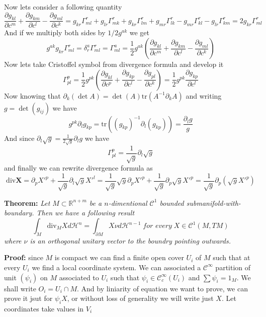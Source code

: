 Now lets consider a following quantity
\[\frac{\partial g_{kl}}{\partial c^m}+\frac{\partial g_{km}}{\partial c^l}-\frac{\partial g_{ml}}{\partial c^k}
=g_{kr}\Gamma^r_{ml}+g_{lr}\Gamma^r_{mk}+g_{kr}\Gamma^r_{lm}+g_{mr}\Gamma^r_{lk}-g_{mr}\Gamma^r_{kl}-g_{lr}\Gamma^r_{km}=2g_{kr}\Gamma^r_{ml}
\]
And if we multiply both sides by $1/2g^{ak}$ we get
\[g^{ak}g_{kr}\Gamma^r_{ml}=\delta_r^a\Gamma^r_{ml}=\Gamma^a_{ml}=\frac{1}{2}g^{ak}(\frac{\partial g_{kl}}{\partial c^m}+\frac{\partial g_{km}}{\partial c^l}-\frac{\partial g_{ml}}{\partial c^k})\]
Now lets take Cristoffel symbol from divergence formula and develop it
\[\Gamma^p_{pl}=\frac{1}{2}g^{pk}(\frac{\partial g_{kl}}{\partial c^p}+\frac{\partial g_{kp}}{\partial c^l}-\frac{\partial g_{pl}}{\partial c^k})
=\frac{1}{2}g^{pk}\frac{\partial g_{kp}}{\partial c^l}\]
Now knowing that $\partial_k(\det A)=\det(A)\text{tr}(A^{-1}\partial_k A)$ and
writing $g=\det(g_{ij})$ we have
\[g^{pk}\partial_l g_{kp}=\text{tr}((g_{kp})^{-1}\partial_l(g_{kp}))=\frac{\partial_l g}{g}\]
And since $\partial_l\sqrt g=\frac{1}{2\sqrt g}\partial_l g$ we have
\[\Gamma^p_{pl}=\frac{1}{\sqrt g}\partial_l\sqrt g\]
and finally we can rewrite divergence formula as
\[\text{div}\mathbf X=\partial_p X'^p+\frac{1}{\sqrt g}\partial_l\sqrt g X'^l
=\frac{1}{\sqrt g}\sqrt g\partial_p X'^p+\frac{1}{\sqrt g}\partial_p\sqrt g X'^p
=\frac{1}{\sqrt g}\partial_p(\sqrt g X'^p)
\]

\vspace{2ex}
\textbf{Theorem:} \textit{Let $M\subset \mathbb R^{n+m}$ be a $n$-dimentional
$\mathcal C^1$ bounded submanifold-with-boundary. Then we have a following result}
\[\int_M \text{div}_MXd\mathcal H^n=\int_{\partial M}X\nu d\mathcal H^{n-1}\;\textit{for every}\;X\in\mathcal C^1(M,TM)\]
\textit{where $\nu$ is an orthogonal unitary vector to the boundry pointing outwards.}

\vspace{1ex}
\textbf{Proof:} since $M$ is compact we can find a finite open cover $U_i$ of
$M$ such that at every $U_i$ we find a local coordinate system. We can associated
a $\mathcal C^\infty$ partition of unit $(\psi_i)$ on $M$ associated to $U_i$ such
that $\psi_i\in\mathcal C^\infty_c(U_i)$ and $\sum\psi_i=1_M$. We shall write
$O_i=U_i\cap M$. And by liniarity of equation we want to prove, we can prove it
jsut for $\psi_iX$, or without loss of generality we will write just $X$. Let
coordinates take values in $V_i$

